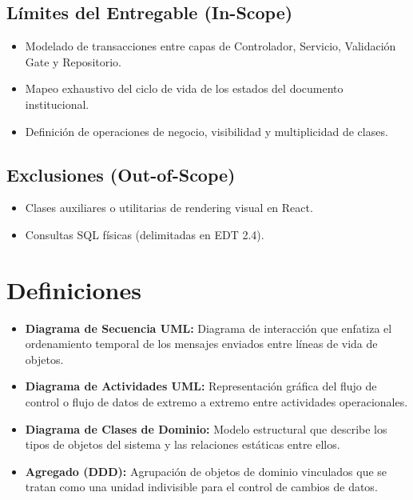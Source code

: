 \documentclass[12pt,a4paper]{article}
\begin{document}
\subsection{Límites del Entregable (In-Scope)}
\begin{itemize}[leftmargin=1.5em, itemsep=2pt]
    \item Modelado de transacciones entre capas de Controlador, Servicio, Validación Gate y Repositorio.
    \item Mapeo exhaustivo del ciclo de vida de los estados del documento institucional.
    \item Definición de operaciones de negocio, visibilidad y multiplicidad de clases.
\end{itemize}
\subsection{Exclusiones (Out-of-Scope)}
\begin{itemize}[leftmargin=1.5em, itemsep=2pt]
    \item Clases auxiliares o utilitarias de rendering visual en React.
    \item Consultas SQL físicas (delimitadas en EDT 2.4).
\end{itemize}

\section{Definiciones}
\begin{itemize}[leftmargin=1.5em, itemsep=2pt]
    \item \textbf{Diagrama de Secuencia UML:} Diagrama de interacción que enfatiza el ordenamiento temporal de los mensajes enviados entre líneas de vida de objetos.
    \item \textbf{Diagrama de Actividades UML:} Representación gráfica del flujo de control o flujo de datos de extremo a extremo entre actividades operacionales.
    \item \textbf{Diagrama de Clases de Dominio:} Modelo estructural que describe los tipos de objetos del sistema y las relaciones estáticas entre ellos.
    \item \textbf{Agregado (DDD):} Agrupación de objetos de dominio vinculados que se tratan como una unidad indivisible para el control de cambios de datos.
\end{itemize}
\end{document}
